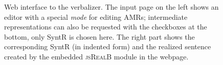 \documentclass[12pt]{article}
\newcommand{\systeme}[1]{\textsc{#1}}
\newcommand{\jsr}{\systeme{jsRealB}}
\newcommand{\representation}[1]{\textsf{#1}}
\newcommand{\SYNTR}{\representation{SyntR}}
\begin{document}
\begin{figure}[ht]
  \centering
    \hfill
  \caption{Web interface to the verbalizer. The input page on the left shows an editor with a special \emph{mode} for editing AMRs; intermediate representations can also be requested with the checkboxes at the bottom, only \SYNTR{} is chosen here. The right part shows the corresponding \SYNTR{} (in indented form) and the realized sentence created by the embedded \jsr{} module in the webpage.}
  \label{fig:web-gophipy}
\end{figure}
%
\clearpage{}
\end{document}
